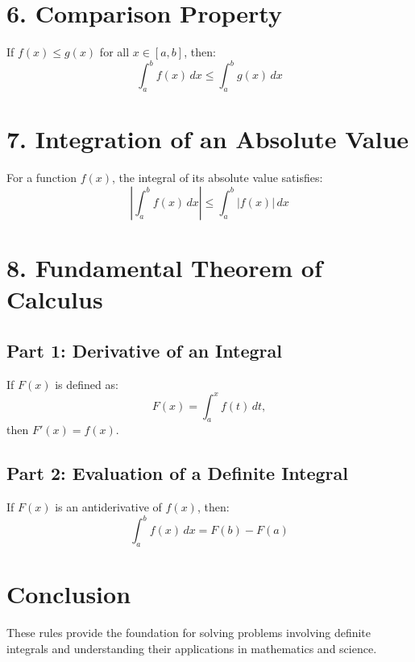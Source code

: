 \documentclass[12pt]{article}
\begin{document}
\section*{6. Comparison Property}
If $f(x) \leq g(x)$ for all $x \in [a, b]$, then:
\[
\int_a^b f(x) \, dx \leq \int_a^b g(x) \, dx
\]

\section*{7. Integration of an Absolute Value}
For a function $f(x)$, the integral of its absolute value satisfies:
\[
\left| \int_a^b f(x) \, dx \right| \leq \int_a^b |f(x)| \, dx
\]

\section*{8. Fundamental Theorem of Calculus}
\subsection*{Part 1: Derivative of an Integral}
If $F(x)$ is defined as:
\[
F(x) = \int_a^x f(t) \, dt,
\]
then $F'(x) = f(x)$.

\subsection*{Part 2: Evaluation of a Definite Integral}
If $F(x)$ is an antiderivative of $f(x)$, then:
\[
\int_a^b f(x) \, dx = F(b) - F(a)
\]

\section*{Conclusion}
These rules provide the foundation for solving problems involving definite integrals and understanding their applications in mathematics and science.
\end{document}
